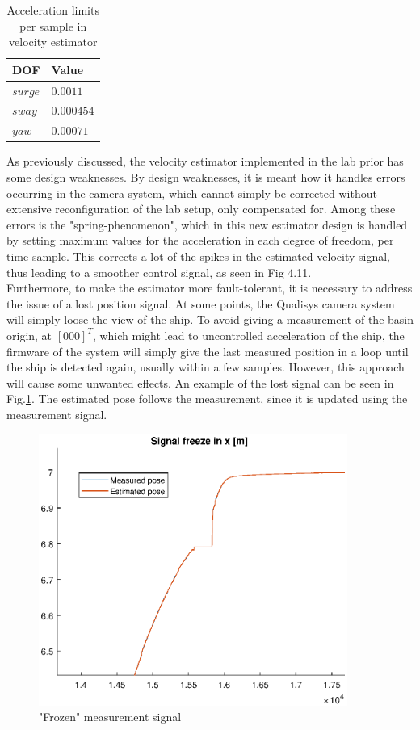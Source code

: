 \begin{table}[!h]
\centering 
\begin{tabular}{| p{2cm} | p{2cm} |}
\hline
\textbf{DOF}& \textbf{Value}    \\ \hline\hline
$surge$ & $0.0011$   \\ \hline
$sway$ & $0.000454$  \\ \hline
$yaw$ & $0.00071$  \\ \hline
\end{tabular}
\caption{Acceleration limits per sample in velocity estimator}
\label{acc_limits_CSAD}
\end{table}

As previously discussed, the velocity estimator implemented in the lab prior has some design weaknesses. By design weaknesses, it is meant how it handles errors occurring in the camera-system, which cannot simply be corrected without extensive reconfiguration of the lab setup, only compensated for. Among these errors is the "spring-phenomenon", which in this new estimator design is handled by setting maximum values for the acceleration in each degree of freedom, per time sample. This corrects a lot of the spikes in the estimated velocity signal, thus leading to a smoother control signal, as seen in Fig 4.11. \\

Furthermore, to make the estimator more fault-tolerant, it is necessary to address the issue of a lost position signal. At some points, the Qualisys camera system will simply loose the view of the ship. To avoid giving a measurement of the basin origin, at $[0 0 0]^T$, which might lead to uncontrolled acceleration of the ship, the firmware of the system will simply give the last measured position in a loop until the ship is detected again, usually within a few samples. However, this approach will cause some unwanted effects. An example of the lost signal can be seen in Fig.\ref{fig:signal_freeze}. The estimated pose follows the measurement, since it is updated using the measurement signal. 

\begin{figure}[!h]
\centering
\includegraphics[width=0.9\textwidth]{plots/signal_freeze.eps}
\caption{"Frozen" measurement signal}
\label{fig:signal_freeze}
\end{figure}

